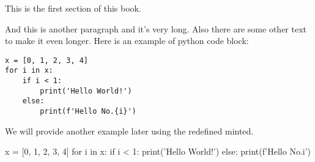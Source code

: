 \documentclass[a4paper,9pt]{article}
\begin{document}
This is the first section of this book.

And this is another paragraph and it's very long.
Also there are some other text to make it even longer.
Here is an example of python code block:
\begin{verbatim}
x = [0, 1, 2, 3, 4]
for i in x:
    if i < 1:
        print('Hello World!')
    else:
        print(f'Hello No.{i}')
\end{verbatim}

We will provide another example later using the redefined minted.
\begin{pycode}
  x = [0, 1, 2, 3, 4]
  for i in x:
      if i < 1:
          print('Hello World!')
      else:
          print(f'Hello No.{i}')
  \end{pycode}
\end{document}
